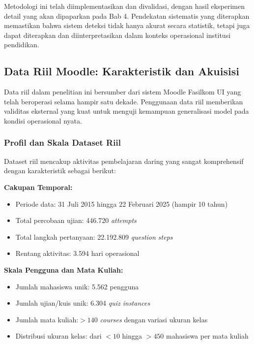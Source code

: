 Metodologi ini telah diimplementasikan dan divalidasi, dengan hasil eksperimen detail yang akan dipaparkan pada Bab 4. Pendekatan sistematis yang diterapkan memastikan bahwa sistem deteksi tidak hanya akurat secara statistik, tetapi juga dapat diterapkan dan diinterpretasikan dalam konteks operasional institusi pendidikan.

\subsection{Data Riil Moodle: Karakteristik dan Akuisisi}
\label{sec:dataRiilMoodle}

Data riil dalam penelitian ini bersumber dari sistem Moodle Fasilkom UI yang telah beroperasi selama hampir satu dekade. Penggunaan data riil memberikan validitas eksternal yang kuat untuk menguji kemampuan generalisasi model pada kondisi operasional nyata.

\subsubsection{Profil dan Skala Dataset Riil}
\label{sec:profilDatasetRiil}

Dataset riil mencakup aktivitas pembelajaran daring yang sangat komprehensif dengan karakteristik sebagai berikut:

\textbf{Cakupan Temporal:}
\begin{itemize}
    \item Periode data: 31 Juli 2015 hingga 22 Februari 2025 (hampir 10 tahun)
    \item Total percobaan ujian: 446.720 \textit{attempts}
    \item Total langkah pertanyaan: 22.192.809 \textit{question steps}
    \item Rentang aktivitas: 3.594 hari operasional
\end{itemize}

\textbf{Skala Pengguna dan Mata Kuliah:}
\begin{itemize}
    \item Jumlah mahasiswa unik: 5.562 pengguna
    \item Jumlah ujian/kuis unik: 6.304 \textit{quiz instances}
    \item Jumlah mata kuliah:$>140$ \textit{courses} dengan variasi ukuran kelas
    \item Distribusi ukuran kelas: dari $<10$ hingga $>450$ mahasiswa per mata kuliah
\end{itemize}

